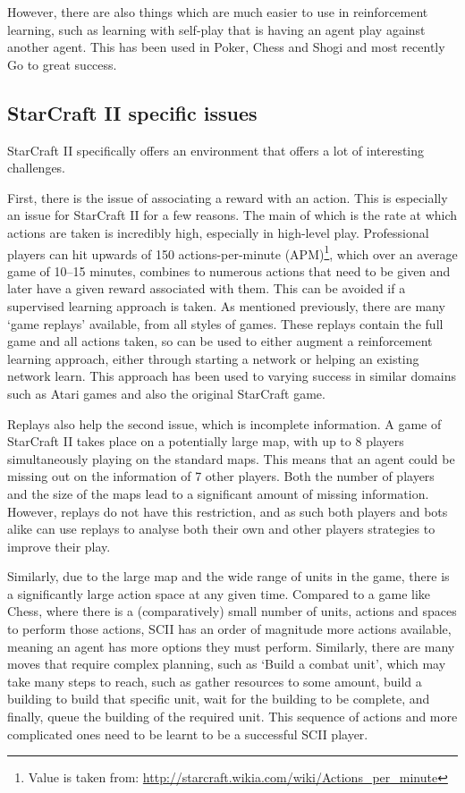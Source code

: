 However, there are also things which are much easier to use in reinforcement
learning, such as learning with self-play that is having an agent play against
another agent. This has been used in Poker\cite{heinrich2016deep}, Chess and
Shogi\cite{silver2017mastering} and most recently
Go\cite{silver2016mastering,silver2017masteringgo} to great success.


\subsection{StarCraft II specific issues}

StarCraft II specifically offers an environment that offers a lot of interesting
challenges.

First, there is the issue of associating a reward with an action. This is
especially an issue for StarCraft II for a few reasons. The main of which is
the rate at which actions are taken is incredibly high, especially in high-level
play. Professional players can hit upwards of 150 actions-per-minute
(APM)\footnote{Value is taken from:
\url{http://starcraft.wikia.com/wiki/Actions_per_minute}}, which over an average
game of 10--15 minutes, combines to numerous actions that need to be given and
later have a given reward associated with them. This can be avoided if a supervised
learning approach is taken. As mentioned previously, there are many `game
replays' available, from all styles of games. These replays contain the full
game and all actions taken, so can be used to either augment a reinforcement
learning approach, either through starting a network or helping an existing
network learn. This approach has been used to varying success in similar domains
such as Atari games\cite{hester2018deep} and also the original StarCraft
game\cite{justesen2017learning}.

Replays also help the second issue, which is incomplete information.
A game of StarCraft II takes place on a potentially large map, with up to 8
players simultaneously playing on the standard maps. This means that an agent
could be missing out on the information of 7 other players. Both the number of
players and the size of the maps lead to a significant amount of missing information.
However, replays do not have this restriction, and as such both players and bots
alike can use replays to analyse both their own and other players strategies to
improve their play.

Similarly, due to the large map and the wide range of units in the game, there
is a significantly large action space at any given time. Compared to a game like
Chess, where there is a (comparatively) small number of units, actions and
spaces to perform those actions, SCII has an order of magnitude more actions
available, meaning an agent has more options they must perform. Similarly, there
are many moves that require complex planning, such as `Build a
combat unit', which may take many steps to reach, such as gather
resources to some amount, build a building to build that specific unit, wait for
the building to be complete, and finally, queue the building of the required
unit. This sequence of actions and more complicated ones need to be learnt to
be a successful SCII player.

